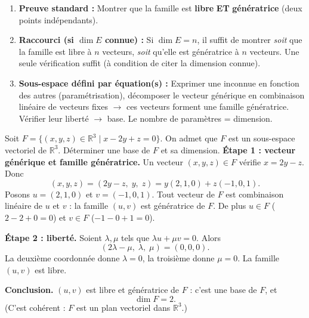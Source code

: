 \documentclass[11pt]{article}
\newcommand{\cle}[1]{{\popxbold\color{popdark}#1}}
\newcounter{popsec}
\newcounter{popsub}
\newcommand{\courssub}[1]{%
  \stepcounter{popsub}%
  \par\vspace{9pt}\noindent{\popxbold\fontsize{11.5}{13}\selectfont\color{popink}{\color{poporange}\thepopsec.\thepopsub}\hspace{6pt}#1}\par\nopagebreak\vspace{4pt}
}
\begin{document}
\begin{methode}
\begin{enumerate}
\item \textbf{Preuve standard :} Montrer que la famille est \textbf{libre} \textbf{ET} \textbf{génératrice} (deux points indépendants).
\item \textbf{Raccourci (si $\dim E$ connue) :} Si $\dim E=n$, il suffit de montrer \emph{soit} que la famille est libre à $n$ vecteurs, \emph{soit} qu'elle est génératrice à $n$ vecteurs. Une seule vérification suffit (à condition de citer la dimension connue).
\item \textbf{Sous-espace défini par équation(s) :} Exprimer une inconnue en fonction des autres (paramétrisation), décomposer le vecteur générique en combinaison linéaire de vecteurs fixes $\to$ ces vecteurs forment une famille génératrice. Vérifier leur liberté $\to$ base. Le nombre de paramètres = dimension.
\end{enumerate}
\end{methode}

\begin{exoresolu}
Soit $F=\{(x,y,z)\in\mathbb{R}^3 \mid x-2y+z=0\}$. On admet que $F$ est un sous-espace vectoriel de $\mathbb{R}^3$. Déterminer une base de $F$ et sa dimension.
\tcblower
\textbf{Étape 1 : vecteur générique et famille génératrice.} Un vecteur $(x,y,z)\in F$ vérifie $x=2y-z$. Donc
\[ (x,y,z)=(2y-z,\;y,\;z)=y(2,1,0)+z(-1,0,1). \]
Posons $u=(2,1,0)$ et $v=(-1,0,1)$. Tout vecteur de $F$ est combinaison linéaire de $u$ et $v$ : la famille $(u,v)$ est \cle{génératrice} de $F$. De plus $u\in F$ ($2-2+0=0$) et $v\in F$ ($-1-0+1=0$).

\textbf{Étape 2 : liberté.} Soient $\lambda,\mu$ tels que $\lambda u+\mu v=0$. Alors
\[ (2\lambda-\mu,\;\lambda,\;\mu)=(0,0,0). \]
La deuxième coordonnée donne $\lambda=0$, la troisième donne $\mu=0$. La famille $(u,v)$ est \cle{libre}.

\textbf{Conclusion.} $(u,v)$ est libre et génératrice de $F$ : c'est une base de $F$, et
\[ \dim F=2. \]
(C'est cohérent : $F$ est un plan vectoriel dans $\mathbb{R}^3$.)
\end{exoresolu}

\courssub{Applications linéaires}
\end{document}
